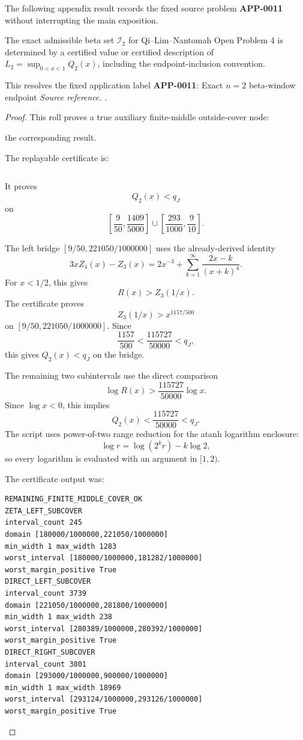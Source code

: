The following appendix result records the fixed source problem \textbf{APP-0011} without interrupting the main exposition.
\begin{corollary}[APP-0011: Exact \(n=2\) beta-window endpoint]
\label{res:q2-terminal-exact}
The exact admissible beta set \(\mathcal I_2\) for Qi--Lim--Nantomah Open Problem 4 is determined by a certified value or certified description of \(L_2=\sup_{0<x<1}Q_2(x)\), including the endpoint-inclusion convention.

This resolves the fixed application label \textbf{APP-0011}: Exact \(n=2\) beta-window endpoint
\emph{Source reference.} \cite{app-app-0011-source}.
\end{corollary}
\begin{proof}
This roll proves a true auxiliary finite-middle outside-cover node:

the corresponding result.

The replayable certificate is:

\begin{verbatim}
\end{verbatim}

It proves
\[
Q_2(x)<q_J
\]
on
\[
\left[\frac9{50},\frac{1409}{5000}\right]
\cup
\left[\frac{293}{1000},\frac9{10}\right].
\]

The left bridge \([9/50,221050/1000000]\) uses the already-derived identity
\[
3xZ_4(x)-Z_3(x)
=2x^{-3}+\sum_{k=1}^{\infty}\frac{2x-k}{(x+k)^4}.
\]
For \(x<1/2\), this gives
\[
R(x)>Z_3(1/x).
\]
The certificate proves
\[
Z_3(1/x)>x^{1157/500}
\]
on \([9/50,221050/1000000]\). Since
\[
\frac{1157}{500}<\frac{115727}{50000}<q_J,
\]
this gives \(Q_2(x)<q_J\) on the bridge.

The remaining two subintervals use the direct comparison
\[
\log R(x)>\frac{115727}{50000}\log x.
\]
Since \(\log x<0\), this implies
\[
Q_2(x)<\frac{115727}{50000}<q_J.
\]
The script uses power-of-two range reduction for the atanh logarithm enclosure:
\[
\log r=\log(2^k r)-k\log 2,
\]
so every logarithm is evaluated with an argument in \([1,2)\).

The certificate output was:

\begin{verbatim}
REMAINING_FINITE_MIDDLE_COVER_OK
ZETA_LEFT_SUBCOVER
interval_count 245
domain [180000/1000000,221050/1000000]
min_width 1 max_width 1283
worst_interval [180000/1000000,181282/1000000]
worst_margin_positive True
DIRECT_LEFT_SUBCOVER
interval_count 3739
domain [221050/1000000,281800/1000000]
min_width 1 max_width 238
worst_interval [280389/1000000,280392/1000000]
worst_margin_positive True
DIRECT_RIGHT_SUBCOVER
interval_count 3801
domain [293000/1000000,900000/1000000]
min_width 1 max_width 18969
worst_interval [293124/1000000,293126/1000000]
worst_margin_positive True
\end{verbatim}


\end{proof}
